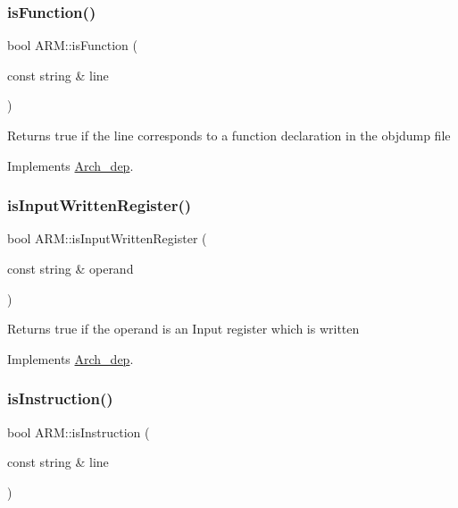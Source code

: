 \subsubsection{\texorpdfstring{is\+Function()}{isFunction()}}
{\footnotesize\ttfamily bool A\+R\+M\+::is\+Function (\begin{DoxyParamCaption}\item[{const string \&}]{line }\end{DoxyParamCaption})\hspace{0.3cm}{\ttfamily [virtual]}}

Returns true if the line corresponds to a function declaration in the objdump file 

Implements \hyperlink{classArch__dep_ae876048f1f6ac62a6f7cb84067189866}{Arch\+\_\+dep}.

\mbox{\label{classARM_a4c35c414b95295974d60a365443c1a4a}} 
\subsubsection{\texorpdfstring{is\+Input\+Written\+Register()}{isInputWrittenRegister()}}
{\footnotesize\ttfamily bool A\+R\+M\+::is\+Input\+Written\+Register (\begin{DoxyParamCaption}\item[{const string \&}]{operand }\end{DoxyParamCaption})\hspace{0.3cm}{\ttfamily [virtual]}}

Returns true if the operand is an Input register which is written 

Implements \hyperlink{classArch__dep_a3d926dc01afb4aebf1136dbe0962a30d}{Arch\+\_\+dep}.

\mbox{\label{classARM_abb7b6e518a9d8cb404ca7a30ad6e0326}} 
\subsubsection{\texorpdfstring{is\+Instruction()}{isInstruction()}}
{\footnotesize\ttfamily bool A\+R\+M\+::is\+Instruction (\begin{DoxyParamCaption}\item[{const string \&}]{line }\end{DoxyParamCaption})\hspace{0.3cm}{\ttfamily [virtual]}}

